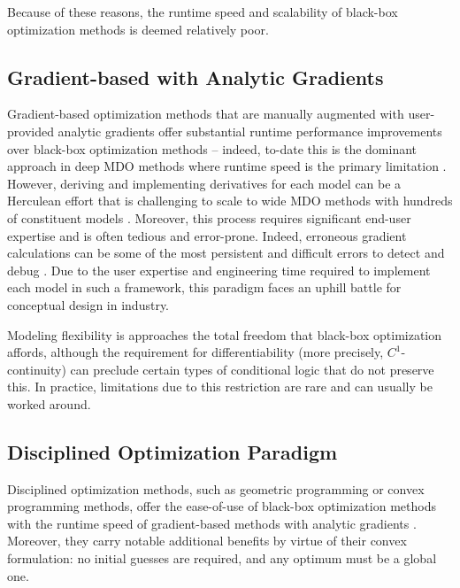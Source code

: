 \documentclass[12pt,vi,oneside,table]{report}
\begin{document}
\begin{appendices}
        Because of these reasons, the runtime speed and scalability of black-box optimization methods is deemed relatively poor.

        \subsection*{Gradient-based with Analytic Gradients}

        Gradient-based optimization methods that are manually augmented with user-provided analytic gradients offer substantial runtime performance improvements over black-box optimization methods -- indeed, to-date this is the dominant approach in deep MDO methods where runtime speed is the primary limitation \cite{martins_coupledadjoint_2005}. However, deriving and implementing derivatives for each model can be a Herculean effort that is challenging to scale to wide MDO methods with hundreds of constituent models \cite{brelje_multidisciplinary_2021}. Moreover, this process requires significant end-user expertise and is often tedious and error-prone. Indeed, erroneous gradient calculations can be some of the most persistent and difficult errors to detect and debug \cite{martins_engineering_2021}. Due to the user expertise and engineering time required to implement each model in such a framework, this paradigm faces an uphill battle for conceptual design in industry.

        Modeling flexibility is approaches the total freedom that black-box optimization affords, although the requirement for differentiability (more precisely, $C^1$-continuity) can preclude certain types of conditional logic that do not preserve this. In practice, limitations due to this restriction are rare and can usually be worked around.

        \subsection*{Disciplined Optimization Paradigm}

        Disciplined optimization methods, such as geometric programming or convex programming methods, offer the ease-of-use of black-box optimization methods with the runtime speed of gradient-based methods with analytic gradients \cite{gpkit, kirschen}. Moreover, they carry notable additional benefits by virtue of their convex formulation: no initial guesses are required, and any optimum must be a global one.


\end{appendices}
\end{document}

